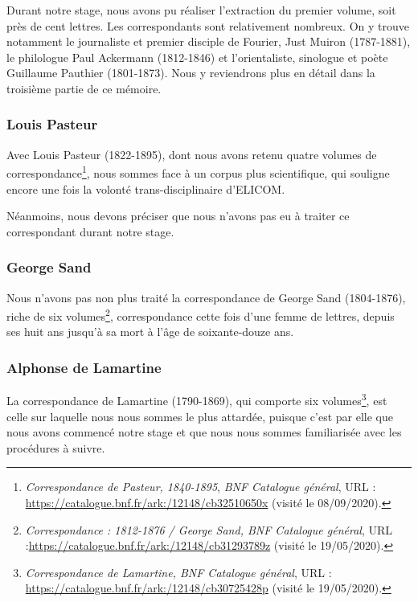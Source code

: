 Durant notre stage, nous avons pu réaliser l'extraction du premier volume, soit près de cent lettres. Les correspondants sont relativement nombreux. On y trouve notamment le journaliste et premier disciple de Fourier, Just Muiron (1787-1881),  le philologue Paul Ackermann (1812-1846) et l'orientaliste, sinologue et poète Guillaume Pauthier (1801-1873). Nous y reviendrons plus en détail dans la troisième partie de ce mémoire.

\subsubsection{Louis Pasteur}

Avec Louis Pasteur (1822-1895), dont nous avons retenu quatre volumes de correspondance\footnote{ \emph{Correspondance de Pasteur, 1840-1895}, \emph{BNF Catalogue général}, URL : \url{https://catalogue.bnf.fr/ark:/12148/cb32510650x} (visité le 08/09/2020).}, nous sommes face à un corpus plus scientifique, qui souligne encore une fois la volonté trans-disciplinaire d'ELICOM.

Néanmoins, nous devons préciser que nous n'avons pas eu à traiter ce correspondant durant notre stage.

\subsubsection{George Sand}

Nous n'avons pas non plus traité la correspondance de George Sand (1804-1876), riche de six volumes\footnote{\emph{Correspondance : 1812-1876 / George Sand, BNF Catalogue général}, URL :\url{https://catalogue.bnf.fr/ark:/12148/cb31293789z} (visité le 19/05/2020).}, correspondance cette fois d'une femme de lettres, depuis ses huit ans jusqu'à sa mort à l'âge de soixante-douze ans.

\subsubsection{Alphonse de Lamartine}

La correspondance de Lamartine (1790-1869), qui comporte six volumes\footnote{ \emph{ Correspondance de Lamartine, BNF Catalogue général}, URL : \url{https://catalogue.bnf.fr/ark:/12148/cb30725428p} (visité le 19/05/2020).}, est celle sur laquelle nous nous sommes le plus attardée, puisque c'est par elle que nous avons commencé notre stage et que nous nous sommes familiarisée avec les procédures à suivre.

